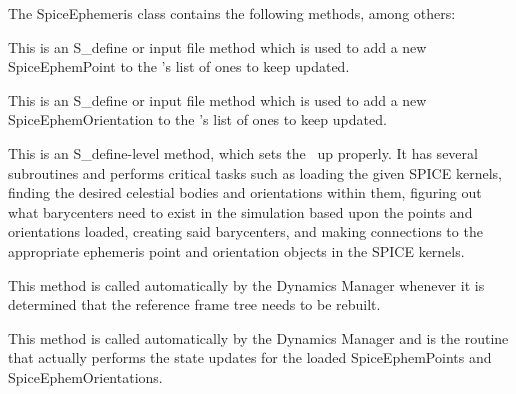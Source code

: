 The SpiceEphemeris class contains the following methods, among others:
\begin{enumerate}

This is an S\_define or input file method which is used to add a new
SpiceEphemPoint to the \SpiceDesc's list of ones to keep updated.

This is an S\_define or input file method which is used to add a new
SpiceEphemOrientation to the \SpiceDesc's list of ones to keep updated.

This is an S\_define-level method, which sets the \SpiceDesc\ up
properly.  It has several subroutines and performs critical tasks such as
loading the given SPICE kernels, finding the desired celestial bodies and
orientations within them, figuring out what barycenters need to exist in
the simulation based upon the points and orientations loaded, creating
said barycenters, and making connections to the appropriate ephemeris
point and orientation objects in the SPICE kernels.

This method is called automatically by the Dynamics Manager whenever it
is determined that the reference frame tree needs to be rebuilt.

This method is called automatically by the Dynamics Manager and is the
routine that actually performs the state updates for the loaded
SpiceEphemPoints and SpiceEphemOrientations.

\end{enumerate}

